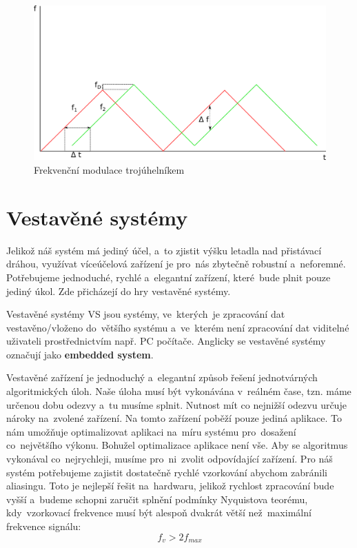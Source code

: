 \begin{itemize}
					\begin{figure}[H]
						\begin{center}
							\includegraphics[scale=0.75]{obrazky-figures/fmcw.png}
					 		\caption{Frekvenční modulace trojúhelníkem}\label{FMCW-triangle}
					 	\end{center}
					\end{figure}
					 
			\end{itemize}
		
		\section{Vestavěné systémy}
			Jelikož náš systém má jediný účel, a~to zjistit výšku letadla nad přistávací dráhou, využívat víceúčelová zařízení je pro~nás zbytečně robustní a~neforemné. Potřebujeme jednoduché, rychlé a~elegantní zařízení, které~bude plnit pouze jediný úkol. Zde přicházejí do hry vestavěné systémy.
			
			\begin{definice}
				Vestavěné systémy VS jsou systémy, ve~kterých~je zpracování dat vestavěno/vloženo do~většího systému a~ve~kterém není zpracování dat viditelné uživateli prostřednictvím např. PC počítače. Anglicky se vestavěné systémy označují jako \textbf{embedded system}\cite{impSkripta}.
			\end{definice}
			
			Vestavěné zařízení je jednoduchý a~elegantní způsob řešení jednotvárných algoritmických úloh. Naše úloha musí být vykonávána v~reálném čase, tzn. máme určenou dobu odezvy a~tu musíme splnit. Nutnost mít co nejnižší odezvu určuje nároky na~zvolené zařízení. Na tomto zařízení poběží pouze jediná aplikace. To nám umožňuje optimalizovat aplikaci na~míru systému pro~dosažení co~největšího výkonu.
			Bohužel optimalizace aplikace není vše. Aby se algoritmus vykonával co~nejrychleji, musíme pro~ni~zvolit odpovídající zařízení. Pro náš systém potřebujeme zajistit dostatečně rychlé vzorkování abychom zabránili aliasingu. Toto je nejlepší řešit na~hardwaru, jelikož rychlost zpracování bude vyšší a~budeme schopni zaručit splnění podmínky Nyquistova teorému, kdy~vzorkovací frekvence musí být alespoň dvakrát větší než~maximální frekvence signálu: \[f_v > 2f_{max}\]
			
